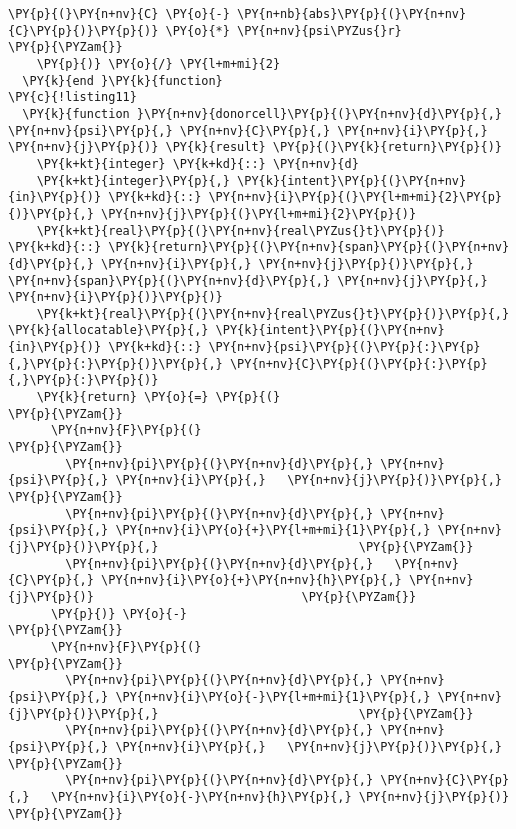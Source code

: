 \begin{Verbatim}[commandchars=\\\{\}]
      \PY{p}{(}\PY{n+nv}{C} \PY{o}{-} \PY{n+nb}{abs}\PY{p}{(}\PY{n+nv}{C}\PY{p}{)}\PY{p}{)} \PY{o}{*} \PY{n+nv}{psi\PYZus{}r}                             \PY{p}{\PYZam{}}
    \PY{p}{)} \PY{o}{/} \PY{l+m+mi}{2}
  \PY{k}{end }\PY{k}{function}
\PY{c}{!listing11}
  \PY{k}{function }\PY{n+nv}{donorcell}\PY{p}{(}\PY{n+nv}{d}\PY{p}{,} \PY{n+nv}{psi}\PY{p}{,} \PY{n+nv}{C}\PY{p}{,} \PY{n+nv}{i}\PY{p}{,} \PY{n+nv}{j}\PY{p}{)} \PY{k}{result} \PY{p}{(}\PY{k}{return}\PY{p}{)}
    \PY{k+kt}{integer} \PY{k+kd}{::} \PY{n+nv}{d}
    \PY{k+kt}{integer}\PY{p}{,} \PY{k}{intent}\PY{p}{(}\PY{n+nv}{in}\PY{p}{)} \PY{k+kd}{::} \PY{n+nv}{i}\PY{p}{(}\PY{l+m+mi}{2}\PY{p}{)}\PY{p}{,} \PY{n+nv}{j}\PY{p}{(}\PY{l+m+mi}{2}\PY{p}{)} 
    \PY{k+kt}{real}\PY{p}{(}\PY{n+nv}{real\PYZus{}t}\PY{p}{)} \PY{k+kd}{::} \PY{k}{return}\PY{p}{(}\PY{n+nv}{span}\PY{p}{(}\PY{n+nv}{d}\PY{p}{,} \PY{n+nv}{i}\PY{p}{,} \PY{n+nv}{j}\PY{p}{)}\PY{p}{,} \PY{n+nv}{span}\PY{p}{(}\PY{n+nv}{d}\PY{p}{,} \PY{n+nv}{j}\PY{p}{,} \PY{n+nv}{i}\PY{p}{)}\PY{p}{)}
    \PY{k+kt}{real}\PY{p}{(}\PY{n+nv}{real\PYZus{}t}\PY{p}{)}\PY{p}{,} \PY{k}{allocatable}\PY{p}{,} \PY{k}{intent}\PY{p}{(}\PY{n+nv}{in}\PY{p}{)} \PY{k+kd}{::} \PY{n+nv}{psi}\PY{p}{(}\PY{p}{:}\PY{p}{,}\PY{p}{:}\PY{p}{)}\PY{p}{,} \PY{n+nv}{C}\PY{p}{(}\PY{p}{:}\PY{p}{,}\PY{p}{:}\PY{p}{)}           
    \PY{k}{return} \PY{o}{=} \PY{p}{(}                                         \PY{p}{\PYZam{}}
      \PY{n+nv}{F}\PY{p}{(}                                               \PY{p}{\PYZam{}}
        \PY{n+nv}{pi}\PY{p}{(}\PY{n+nv}{d}\PY{p}{,} \PY{n+nv}{psi}\PY{p}{,} \PY{n+nv}{i}\PY{p}{,}   \PY{n+nv}{j}\PY{p}{)}\PY{p}{,}                            \PY{p}{\PYZam{}}
        \PY{n+nv}{pi}\PY{p}{(}\PY{n+nv}{d}\PY{p}{,} \PY{n+nv}{psi}\PY{p}{,} \PY{n+nv}{i}\PY{o}{+}\PY{l+m+mi}{1}\PY{p}{,} \PY{n+nv}{j}\PY{p}{)}\PY{p}{,}                            \PY{p}{\PYZam{}}
        \PY{n+nv}{pi}\PY{p}{(}\PY{n+nv}{d}\PY{p}{,}   \PY{n+nv}{C}\PY{p}{,} \PY{n+nv}{i}\PY{o}{+}\PY{n+nv}{h}\PY{p}{,} \PY{n+nv}{j}\PY{p}{)}                             \PY{p}{\PYZam{}}
      \PY{p}{)} \PY{o}{-}                                              \PY{p}{\PYZam{}}
      \PY{n+nv}{F}\PY{p}{(}                                               \PY{p}{\PYZam{}}
        \PY{n+nv}{pi}\PY{p}{(}\PY{n+nv}{d}\PY{p}{,} \PY{n+nv}{psi}\PY{p}{,} \PY{n+nv}{i}\PY{o}{-}\PY{l+m+mi}{1}\PY{p}{,} \PY{n+nv}{j}\PY{p}{)}\PY{p}{,}                            \PY{p}{\PYZam{}}
        \PY{n+nv}{pi}\PY{p}{(}\PY{n+nv}{d}\PY{p}{,} \PY{n+nv}{psi}\PY{p}{,} \PY{n+nv}{i}\PY{p}{,}   \PY{n+nv}{j}\PY{p}{)}\PY{p}{,}                            \PY{p}{\PYZam{}}
        \PY{n+nv}{pi}\PY{p}{(}\PY{n+nv}{d}\PY{p}{,} \PY{n+nv}{C}\PY{p}{,}   \PY{n+nv}{i}\PY{o}{-}\PY{n+nv}{h}\PY{p}{,} \PY{n+nv}{j}\PY{p}{)}                             \PY{p}{\PYZam{}}

\end{Verbatim}
